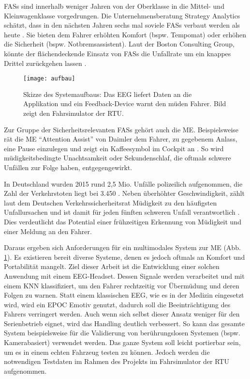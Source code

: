 \label{chap:intro}

\acl{FASs} sind innerhalb weniger Jahren von der Oberklasse in die Mittel- und Kleinwagenklasse vorgedrungen. Die Unternehmensberatung Strategy Analytics schätzt, dass in den nächsten Jahren sechs mal soviele \acl{FASs} verbaut werden als heute \cite{strategy_analytics}. Sie bieten dem Fahrer erhöhten Komfort (bspw. Tempomat) oder erhöhen die Sicherheit (bspw. Notbremsassistent). Laut der Boston Consulting Group, könnte der flächendeckende Einsatz von \acl{FASs} die Unfallrate um ein knappes Drittel zurückgehen lassen \cite{bcgperspectives}. 

\begin{figure}[h] 
  \begin{center}
    \texttt{[image: aufbau]}
    \caption[Skizze des Systemaufbaus]{Skizze des Systemaufbaus: Das EEG liefert Daten an die Applikation und ein Feedback-Device warnt den müden Fahrer. Bild zeigt den Fahrsimulator der \acl{RTU}. \label{fig:sketch}}
  \end{center}
\end{figure}

Zur Gruppe der Sicherheitsrelevanten \acl{FASs} gehört auch die \acl{ME}. Beispielsweise rät die \acl{ME} "`Attention Assist"' von Daimler dem Fahrer, zu gegebenem Anlass, eine Pause einzulegen und zeigt ein Kaffeesymbol im Cockpit an \cite{Daimler}. So wird müdigkeitsbedingte Unachtsamkeit oder Sekundenschlaf, die oftmals schwere Unfällen zur Folge haben, entgegengewirkt.

In Deutschland wurden 2015 rund 2,5 Mio. Unfälle polizeilich aufgenommen, die Zahl der Verkehrstoten liegt bei 3.450 \cite{accident_statistic}. Neben überhöhter Geschwindigkeit, zählt laut dem Deutschen Verkehrssicherheitsrat Müdigkeit zu den häufigsten Unfallursachen und ist damit für jeden fünften schweren Unfall verantwortlich \cite{dvr_statistic}. Dies verdeutlicht das Potential einer frühzeitigen Erkennung von Müdigkeit und einer Meldung an den Fahrer.

\problemDetail

Daraus ergeben sich Anforderungen für ein multimodales System zur \acl{ME}  (Abb. \ref{fig:sketch}). Es existieren bereit diverse Systeme, denen es jedoch oftmals an Komfort und Portabilität mangelt. Ziel dieser Arbeit ist die Entwicklung einer solchen Anwendung mit einem EEG-Headset. 
Dessen Signale werden verarbeitet und mit einem KNN klassifiziert, um den Fahrer rechtzeitig vor Übermüdung und deren Folgen zu warnen.
Statt einem klassischen EEG, wie es in der Medizin eingesetzt wird, wird ein EPOC Emotiv genutzt, dadurch soll die Beeinträchtigung des Fahrers verringert werden. Auch wenn sich selbst dieser Ansatz weniger für den Serienbetrieb eignet, wird das Handling deutlich verbessert. So kann das gesamte System beispielsweise für die Validierung von berührungslosen Systemen (bspw. Kamerabasiert) verwendet werden. Das ganze System soll leicht portierbar sein, um es in einem echten Fahrzeug testen zu können. Jedoch werden die notwendigen Testdaten im Rahmen des Projekts im Fahrsimulator der \acl{RTU} aufgenommen.

\tofc